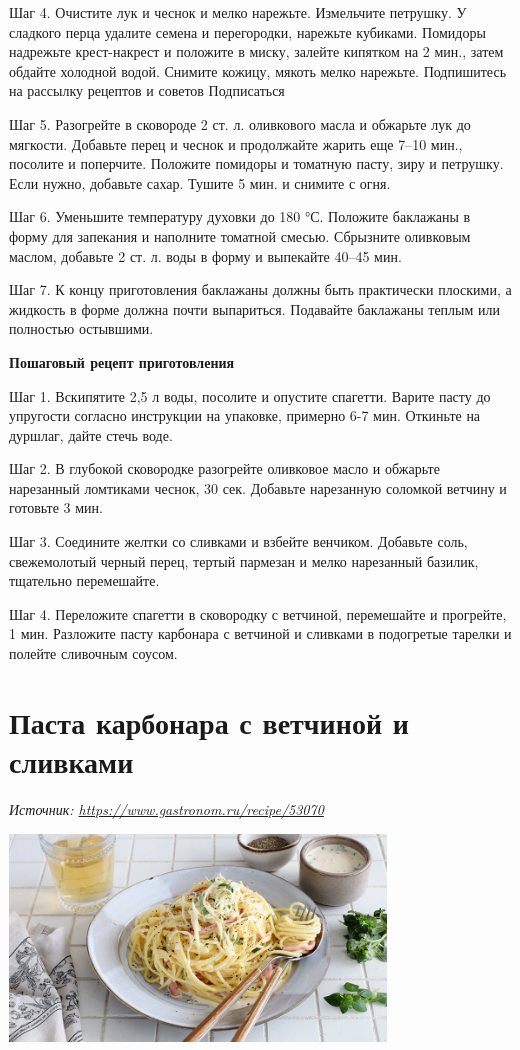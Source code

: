 Шаг 4.  Очистите лук и чеснок и мелко нарежьте. Измельчите петрушку. У сладкого перца удалите семена и перегородки, нарежьте кубиками. Помидоры надрежьте крест-накрест и положите в миску, залейте кипятком на 2 мин., затем обдайте холодной водой. Снимите кожицу, мякоть мелко нарежьте.
Подпишитесь на рассылку рецептов и советов
Подписаться


Шаг 5. Разогрейте в сковороде 2 ст. л. оливкового масла и обжарьте лук до мягкости. Добавьте перец и чеснок и продолжайте жарить еще 7–10 мин., посолите и поперчите. Положите помидоры и томатную пасту, зиру и петрушку. Если нужно, добавьте сахар. Тушите 5 мин. и снимите с огня.

Шаг 6. Уменьшите температуру духовки до 180 °С. Положите баклажаны в форму для запекания и наполните томатной смесью. Сбрызните оливковым маслом, добавьте 2 ст. л. воды в форму и выпекайте 40–45 мин.

Шаг 7. К концу приготовления баклажаны должны быть практически плоскими, а жидкость в форме должна почти выпариться. Подавайте баклажаны теплым или полностью остывшими.

\textbf{Пошаговый рецепт приготовления}

Шаг 1. Вскипятите 2,5 л воды, посолите и опустите спагетти. Варите пасту до упругости согласно инструкции на упаковке, примерно 6-7 мин. Откиньте на дуршлаг, дайте стечь воде.

Шаг 2. В глубокой сковородке разогрейте оливковое масло и обжарьте нарезанный ломтиками чеснок, 30 сек. Добавьте нарезанную соломкой ветчину и готовьте 3 мин.

Шаг 3. Соедините желтки со сливками и взбейте венчиком. Добавьте соль, свежемолотый черный перец, тертый пармезан и мелко нарезанный базилик, тщательно перемешайте.

Шаг 4. Переложите спагетти в сковородку с ветчиной, перемешайте и прогрейте, 1 мин. Разложите пасту карбонара с ветчиной и сливками в подогретые тарелки и полейте сливочным соусом.






\newpage
\section{Паста карбонара с ветчиной и сливками}


 {\it Источник: \url{https://www.gastronom.ru/recipe/53070}}

\includegraphics[width=0.75\textwidth]{img/carbonara.jpg}


